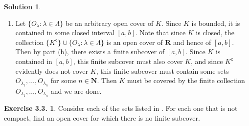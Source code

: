 \documentclass[12pt]{article}
\theoremstyle{definition}
\theoremstyle{exercise}
\newtheorem{exercise}{Exercise 3.3.}
\theoremstyle{solution}
\newtheorem*{solution}{Solution}
\newcommand{\setcomp}[1]{#1^{\mathsf{c}}}
\newcommand{\N}{\mathbf{N}}
\newcommand{\R}{\mathbf{R}}
\begin{document}
\begin{solution}
\begin{enumerate}
        \item Let \( \{ O_{\lambda} : \lambda \in \Lambda \} \) be an arbitrary open cover of \( K \). Since \( K \) is bounded, it is contained in some closed interval \( [a, b] \). Note that since \( K \) is closed, the collection \( \{ \setcomp{K} \} \cup \{ O_{\lambda} : \lambda \in \Lambda \} \) is an open cover of \( \R \) and hence of \( [a, b] \). Then by part (b), there exists a finite subcover of \( [a, b] \). Since \( K \) is contained in \( [a, b] \), this finite subcover must also cover \( K \), and since \( \setcomp{K} \) evidently does not cover \( K \), this finite subcover must contain some sets \( O_{\lambda_1}, \ldots, O_{\lambda_n} \) for some \( n \in \N \). Then \( K \) must be covered by the finite collection \( O_{\lambda_1}, \ldots, O_{\lambda_n} \) and we are done.
    \end{enumerate}
\end{solution}

\begin{exercise}
\label{ex:11}
    Consider each of the sets listed in . For each one that is not compact, find an open cover for which there is no finite subcover.
\end{exercise}
\end{document}
